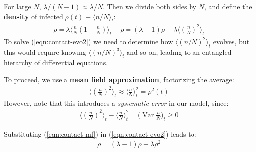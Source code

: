 \documentclass[../../main.tex]{subfiles}
\begin{document}
For large $N$, $\lambda/(N-1) \approx \lambda/N$. Then we divide both sides by $N$, and define the \textbf{density} of infected $\rho(t) \equiv \langle n/N \rangle_t$:
\begin{align}\label{eqn:contact-evo2}
    \dot{\rho} = \lambda \langle \frac{n}{N} \left(1- \frac{n}{N} \right)  \rangle_t - \rho = (\lambda - 1)\rho - \lambda \langle \left(\frac{n}{N} \right)^2 \rangle_t
\end{align}
To solve (\ref{eqn:contact-evo2}) we need to determine how $\langle (n/N)^2 \rangle_t$ evolves, but this would require knowing $\langle (n/N)^3 \rangle_t$ and so on, leading to an entangled hierarchy of differential equations.

\medskip

To proceed, we use a \textbf{mean field approximation}, factorizing the average:
\begin{align}\label{eqn:contact-mf}
    \langle \left(\frac{n}{N} \right)^2 \rangle_t \approx \langle \frac{n}{N}  \rangle^2_t = \rho^2(t)
\end{align} 
However, note that this introduces a \textit{systematic error} in our model, since:
\begin{align}\label{eqn:var-term}
    \langle \left(\frac{n}{N} \right)^2 \rangle_t - \langle \frac{n}{N}  \rangle^2_t = \Big(\operatorname{Var} \frac{n}{N} \Big)_t \geq 0
\end{align} 

Substituting (\ref{eqn:contact-mf}) in (\ref{eqn:contact-evo2}) leads to:
\begin{align}\label{eqn:contact-evo3}
    \dot{\rho} = (\lambda - 1) \rho - \lambda \rho^2
\end{align}
\end{document}
